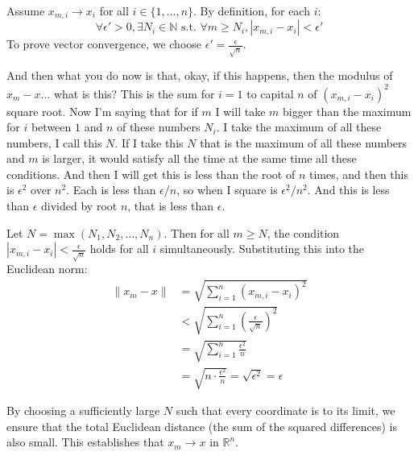 \begin{math-stroke}[Proof: Implication \texorpdfstring{$\impliedby$}{<=}]
Assume $x_{m,i} \to x_i$ for all $i \in \{1, \dots, n\}$.
By definition, for each $i$:
\[ \forall \epsilon' > 0, \exists N_i \in \mathbb{N} \text{ s.t. } \forall m \ge N_i, |x_{m,i} - x_i| < \epsilon' \]
To prove vector convergence, we choose $\epsilon' = \frac{\epsilon}{\sqrt{n}}$.
\end{math-stroke}

\begin{spoken-clean}[00:22:55 - 00:24:45]
And then what you do now is that, okay, if this happens, then the modulus of $x_m - x$... what is this? This is the sum for $i=1$ to capital $n$ of $(x_{m,i} - x_i)^2$ square root. Now I'm saying that for if $m$ I will take $m$ bigger than the maximum for $i$ between $1$ and $n$ of these numbers $N_i$. I take the maximum of all these numbers, I call this $N$. If I take this $N$ that is the maximum of all these numbers and $m$ is larger, it would satisfy all the time at the same time all these conditions. And then I will get this is less than the root of $n$ times, and then this is $\epsilon^2$ over $n^2$. Each is less than $\epsilon/n$, so when I square is $\epsilon^2/n^2$. And this is less than $\epsilon$ divided by root $n$, that is less than $\epsilon$.
\end{spoken-clean}

\begin{math-stroke}
Let $N = \max(N_1, N_2, \dots, N_n)$. Then for all $m \ge N$, the condition $|x_{m,i} - x_i| < \frac{\epsilon}{\sqrt{n}}$ holds for all $i$ simultaneously.
Substituting this into the Euclidean norm:
\begin{align*}
\|x_m - x\| &= \sqrt{\sum_{i=1}^n (x_{m,i} - x_i)^2} \\
&< \sqrt{\sum_{i=1}^n \left( \frac{\epsilon}{\sqrt{n}} \right)^2} \\
&= \sqrt{\sum_{i=1}^n \frac{\epsilon^2}{n}} \\
&= \sqrt{n \cdot \frac{\epsilon^2}{n}} = \sqrt{\epsilon^2} = \epsilon
\end{align*}
\begin{explanation-of-steps}
By choosing a sufficiently large $N$ such that every coordinate is  to its limit, we ensure that the total Euclidean distance (the sum of the squared differences) is also small. This establishes that $x_m \to x$ in $\mathbb{R}^n$.
\end{explanation-of-steps}
\end{math-stroke}

